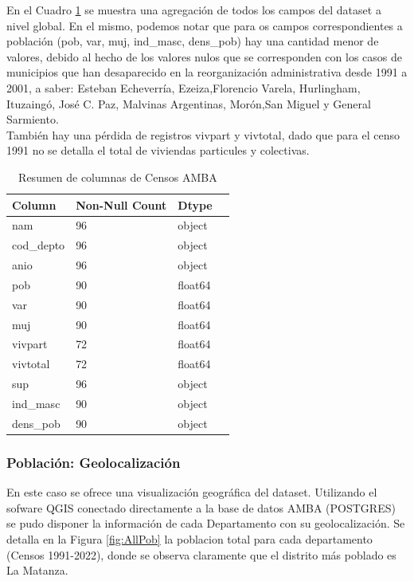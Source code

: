 \documentclass{article}
\theoremstyle{mytheoremstyle}
\theoremstyle{mytheoremstyle}
\theoremstyle{myproblemstyle}
\begin{document}
  En el Cuadro \ref{tab:summaryCensos} se muestra una agregación de todos los campos del dataset a nivel global. 
En el mismo, podemos notar que para os campos correspondientes a población (pob, var, muj, ind_masc, dens_pob) 
hay una cantidad menor de valores, debido al hecho de los valores nulos que se corresponden con los casos de municipios 
que han desaparecido en la reorganización administrativa desde 1991 a 2001, a saber: Esteban Echeverría, Ezeiza,Florencio Varela, 
Hurlingham, Ituzaingó, José C. Paz, Malvinas Argentinas, Morón,San Miguel y General Sarmiento. \\
También hay una pérdida de registros vivpart y vivtotal, dado que para el censo 1991 no se detalla el total de viviendas particules y colectivas.

\begin{table}[htb]
    \centering
     \begin{tabular}{llll}
        \toprule
        \textbf{Column} & \textbf{Non-Null Count} & \textbf{Dtype} \\
        \midrule
        nam & 96 & object \\
        cod\_depto & 96 & object \\
        anio & 96 & object \\
        pob & 90 & float64 \\
        var & 90 & float64 \\
        muj & 90 & float64 \\
        vivpart & 72 & float64 \\
        vivtotal & 72 & float64 \\
        sup & 96 & object \\
        ind\_masc & 90 & object \\
        dens\_pob & 90 & object \\
        \bottomrule
    \end{tabular}
   \caption{Resumen de columnas de Censos AMBA}
    \label{tab:summaryCensos}
\end{table}

\subsubsection{Población: Geolocalización}

En este caso se ofrece una visualización geográfica del dataset. Utilizando el sofware QGIS conectado directamente a la base de 
datos AMBA (POSTGRES) se pudo disponer la información de cada Departamento con su geolocalización.
 Se detalla en la Figura \ref{fig:AllPob} la poblacion total para cada departamento (Censos 1991-2022), donde se observa claramente que el distrito más poblado 
 es La Matanza.
\end{document}
